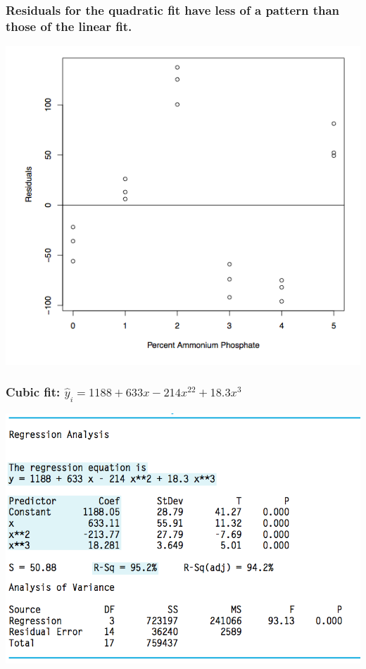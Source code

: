 \documentclass[handout]{beamer}
\providecommand{\wh}[1]{\widehat{#1}}
\numberwithin{equation}{section}
\begin{document}
\begin{frame}
\frametitle{\small Residuals for the quadratic fit have less of a pattern than those of the linear fit.}
 \includegraphics{../../fig/flyashquadres.png}
\end{frame}




\begin{frame}
\frametitle{Cubic fit: $\wh{y}_i = 1188 + 633 x - 214 x^22 + 18.3 x^3$}
 \includegraphics{../../fig/flyashcubicfitoutput.png}
\end{frame}
\end{document}

